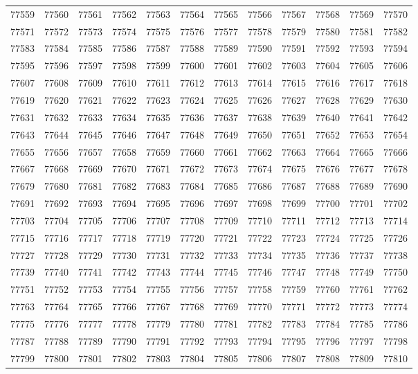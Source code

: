 \begin{center}
\begin{longtable}{llllllllllll}
77559 &77560 &77561 &77562 &77563 &77564 &77565 &77566 &77567 &77568 &77569 &77570 \\
77571 &77572 &77573 &77574 &77575 &77576 &77577 &77578 &77579 &77580 &77581 &77582 \\
77583 &77584 &77585 &77586 &77587 &77588 &77589 &77590 &77591 &77592 &77593 &77594 \\
77595 &77596 &77597 &77598 &77599 &77600 &77601 &77602 &77603 &77604 &77605 &77606 \\
77607 &77608 &77609 &77610 &77611 &77612 &77613 &77614 &77615 &77616 &77617 &77618 \\
77619 &77620 &77621 &77622 &77623 &77624 &77625 &77626 &77627 &77628 &77629 &77630 \\
77631 &77632 &77633 &77634 &77635 &77636 &77637 &77638 &77639 &77640 &77641 &77642 \\
77643 &77644 &77645 &77646 &77647 &77648 &77649 &77650 &77651 &77652 &77653 &77654 \\
77655 &77656 &77657 &77658 &77659 &77660 &77661 &77662 &77663 &77664 &77665 &77666 \\
77667 &77668 &77669 &77670 &77671 &77672 &77673 &77674 &77675 &77676 &77677 &77678 \\
77679 &77680 &77681 &77682 &77683 &77684 &77685 &77686 &77687 &77688 &77689 &77690 \\
77691 &77692 &77693 &77694 &77695 &77696 &77697 &77698 &77699 &77700 &77701 &77702 \\
77703 &77704 &77705 &77706 &77707 &77708 &77709 &77710 &77711 &77712 &77713 &77714 \\
77715 &77716 &77717 &77718 &77719 &77720 &77721 &77722 &77723 &77724 &77725 &77726 \\
77727 &77728 &77729 &77730 &77731 &77732 &77733 &77734 &77735 &77736 &77737 &77738 \\
77739 &77740 &77741 &77742 &77743 &77744 &77745 &77746 &77747 &77748 &77749 &77750 \\
77751 &77752 &77753 &77754 &77755 &77756 &77757 &77758 &77759 &77760 &77761 &77762 \\
77763 &77764 &77765 &77766 &77767 &77768 &77769 &77770 &77771 &77772 &77773 &77774 \\
77775 &77776 &77777 &77778 &77779 &77780 &77781 &77782 &77783 &77784 &77785 &77786 \\
77787 &77788 &77789 &77790 &77791 &77792 &77793 &77794 &77795 &77796 &77797 &77798 \\
77799 &77800 &77801 &77802 &77803 &77804 &77805 &77806 &77807 &77808 &77809 &77810 \\

\end{longtable}
\end{center}
